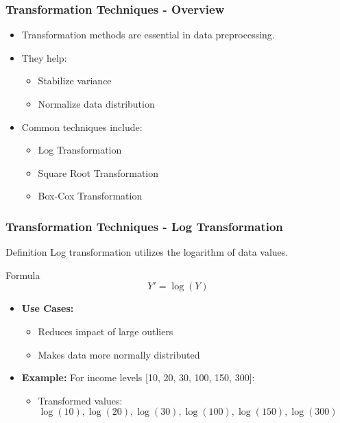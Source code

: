 \documentclass[aspectratio=169]{beamer}
\begin{document}
\begin{frame}
    \frametitle{Transformation Techniques - Overview}
    \begin{itemize}
        \item Transformation methods are essential in data preprocessing.
        \item They help:
        \begin{itemize}
            \item Stabilize variance
            \item Normalize data distribution
            \end{itemize}
        \item Common techniques include:
        \begin{itemize}
            \item Log Transformation
            \item Square Root Transformation
            \item Box-Cox Transformation
        \end{itemize}
    \end{itemize}
\end{frame}

\begin{frame}[fragile]
    \frametitle{Transformation Techniques - Log Transformation}
    \begin{block}{Definition}
        Log transformation utilizes the logarithm of data values.
    \end{block}
    
    \begin{block}{Formula}
    \begin{equation}
        Y' = \log(Y)
    \end{equation}
    \end{block}
    
    \begin{itemize}
        \item \textbf{Use Cases:}
        \begin{itemize}
            \item Reduces impact of large outliers
            \item Makes data more normally distributed
        \end{itemize}
        \item \textbf{Example:} For income levels [10, 20, 30, 100, 150, 300]:
        \begin{itemize}
            \item Transformed values: \( \log(10), \log(20), \log(30), \log(100), \log(150), \log(300) \)
        \end{itemize}
    \end{itemize}
\end{frame}
\end{document}
